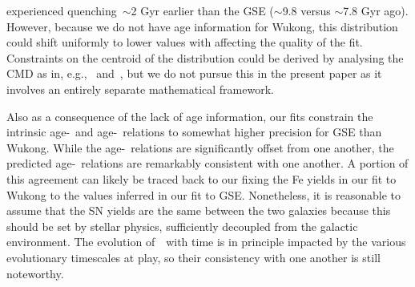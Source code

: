 \documentclass[ms.tex]{subfiles}
\begin{document}
experienced quenching~$\sim$2 Gyr earlier than the GSE ($\sim$9.8 versus
$\sim$7.8 Gyr ago).
However, because we do not have age information for Wukong, this distribution
could shift uniformly to lower values with affecting the quality of the fit.
Constraints on the centroid of the distribution could be derived by
analysing the CMD as in, e.g.,~\citet{Dolphin2002} and~\citet{Weisz2014b}, but
we do not pursue this in the present paper as it involves an entirely separate
mathematical framework.
\par
Also as a consequence of the lack of age information, our fits constrain the
intrinsic age-\feh~and age-\afe~relations to somewhat higher precision for GSE
than Wukong.
While the age-\feh~relations are significantly offset from one another, the
predicted age-\afe~relations are remarkably consistent with one another.
A portion of this agreement can likely be traced back to our fixing the Fe
yields in our fit to Wukong to the values inferred in our fit to GSE.
Nonetheless, it is reasonable to assume that the SN yields are the same between
the two galaxies because this should be set by stellar physics, sufficiently
decoupled from the galactic environment.
The evolution of~\afe~with time is in principle impacted by the various
evolutionary timescales at play, so their consistency with one another is still
noteworthy.
\end{document}
